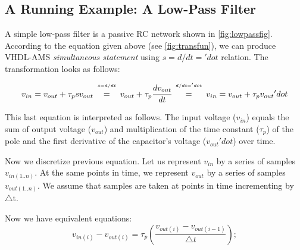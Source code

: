 \documentclass{article}
\begin{document}
\subsection{A Running Example: A Low-Pass Filter}
\label{subsec:lptransfunc} 

 

A simple low-pass filter is a passive RC network shown in
\autoref{fig:lowpassfig}.  According to the equation given above (see
\autoref{fig:transfun}), we can produce VHDL-AMS \emph{simultaneous
  statement} using \texttt{$s = d/dt = 'dot$} relation.  The
transformation looks as follows:
\begin{equation}
v_{in} = v_{out} + \tau_psv_{out} 
   \begin{array}[b]{c}                                                                                                                                    
      {\scriptscriptstyle s = d/dt}  \\=                                                                                                                  
   \end{array} 
v_{out} + \tau_p\cfrac{dv_{out}}{dt}
\begin{array}[b]{c}                                                                                                                                    
      {\scriptscriptstyle d/dt = } {\scriptscriptstyle 'dot} \\=                                                                                                                  
   \end{array}
  v_{in} = v_{out} + \tau_pv_{out}{'dot} 
\end{equation} 

This last equation is interpreted as follows.  The input voltage
($v_{in}$) equals the sum of output voltage ($v_{out}$) and
multiplication of the time constant ($\tau_p$) of the pole and the
first derivative of the capacitor's voltage ($v_{out}{'dot}$) over
time.

Now we discretize previous equation.  Let us represent $v_{in}$ by a
series of samples $v_{in(1..n)}$.  At the same points in time, we
represent $v_{out}$ by a series of samples $v_{out(1..n)}$.  We assume
that samples are taken at points in time incrementing by $\triangle$t.

Now we have equivalent equations:
\begin{equation}
  v_{in(i)}- v_{out(i)}=\tau_p(\frac{v_{out(i)}- v_{out(i-1)}}
  {\triangle t});
\end{equation}
\end{document}

